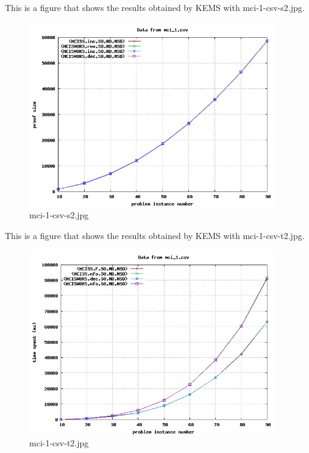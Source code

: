 This is a figure that shows the results obtained by KEMS with mci-1-csv-s2.jpg.
\begin{figure}[htbp]
\begin{center}
\includegraphics[width=0.95\textwidth]{figuras/mci-1-csv-s2.jpg}
\end{center}
\caption{mci-1-csv-s2.jpg}
\end{figure}

This is a figure that shows the results obtained by KEMS with mci-1-csv-t2.jpg.
\begin{figure}[htbp]
\begin{center}
\includegraphics[width=0.95\textwidth]{figuras/mci-1-csv-t2.jpg}
\end{center}
\caption{mci-1-csv-t2.jpg}
\end{figure}

